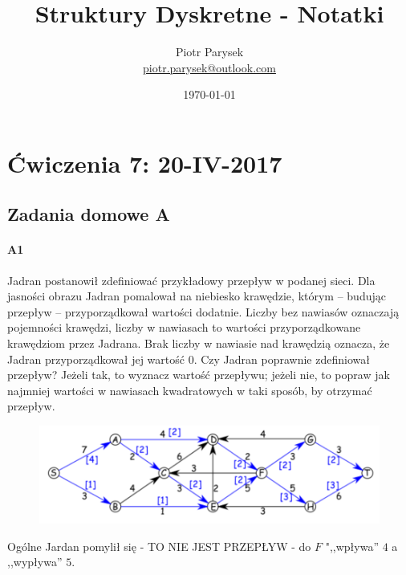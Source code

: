 \documentclass[a4paper,12pt]{article}
\title{Struktury Dyskretne - Notatki}
\author{Piotr Parysek\\
\href{mailto:piotr.parysek@outlook.com}{piotr.parysek@outlook.com} }
\date{\today}
\theoremstyle{definition}%
\theoremstyle{definition}
\theoremstyle{problem}
\begin{document}
\maketitle

\tableofcontents
\section{Ćwiczenia 7: 20-IV-2017}
\subsection{Zadania domowe A}

\paragraph{A1} Jadran postanowił zdefiniować przykładowy przepływ w podanej sieci. Dla jasności obrazu Jadran pomalował na niebiesko krawędzie, którym – budując przepływ – przyporządkował wartości dodatnie. Liczby bez nawiasów oznaczają pojemności krawędzi, liczby w nawiasach to wartości przyporządkowane krawędziom przez Jadrana. Brak liczby w nawiasie nad krawędzią oznacza, że Jadran przyporządkował jej wartość 0. Czy Jadran poprawnie zdefiniował przepływ? Jeżeli tak, to wyznacz wartość przepływu; jeżeli nie, to popraw jak najmniej wartości w nawiasach kwadratowych w taki sposób, by otrzymać przepływ.
\begin{figure}[H]
\centering
\includegraphics[width=.8\textwidth]{img/7_A1}
\end{figure}
Ogólne Jardan pomylił się - TO NIE JEST PRZEPŁYW - do $F$ ",,wpływa'' $4$ a ,,wypływa'' $5$.
\end{document}
